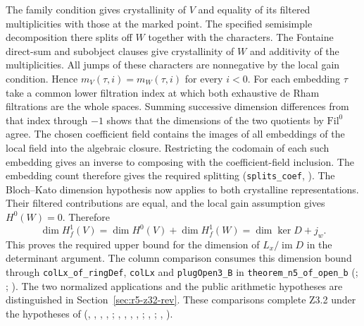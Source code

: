 The family condition gives crystallinity of $V$ and equality of its
filtered multiplicities with those at the marked point. The specified
semisimple decomposition there splits off $W$ together with the
characters. The Fontaine direct-sum and subobject clauses give
crystallinity of $W$ and additivity of the multiplicities. All jumps
of these characters are nonnegative by the local gain condition.
Hence $m_V(\tau,i)=m_W(\tau,i)$ for every $i<0$.
For each embedding $\tau$ take a common lower filtration index at which
both exhaustive de Rham filtrations are the whole spaces. Summing
successive dimension differences from that index through $-1$
shows that the dimensions of the two quotients by $\mathrm{Fil}^0$
agree. The chosen coefficient field contains the images of all embeddings of
the local field into the algebraic closure. Restricting the codomain
of each such embedding gives an inverse to composing with the
coefficient-field inclusion. The embedding count therefore gives
the required splitting (\nolinkurl{splits_coef},
).
The Bloch--Kato dimension hypothesis now applies to both crystalline
representations. Their filtered contributions
are equal, and the local gain assumption gives $H^0(W)=0$.
Therefore
\[
 \dim H_f^1(V)=\dim H^0(V)+\dim H_f^1(W)
                =\dim\ker D+j_w .
\]
This proves the required upper bound for the dimension of
$L_x/\operatorname{im}D$ in the determinant argument.
The column comparison consumes this dimension bound through
\nolinkurl{colLx_of_ringDef}, \nolinkurl{colLx} and
\nolinkurl{plugOpen3_B} in \nolinkurl{theorem_n5_of_open_b}
(;
;
).
The two normalized applications and the public arithmetic hypotheses
are distinguished in Section~\ref{sec:r5-z32-rev}.
These comparisons complete Z3.2 under the hypotheses of
(, , , ,
;
, , , ,
;
, ;
, ).

